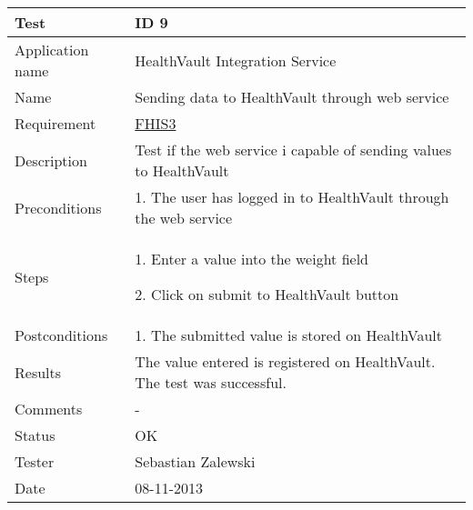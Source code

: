 \begin{table}
\begin{center}
\begin{tabular}{ | l | p{10cm} | }
	\hline
	\textbf{Test}	&	\textbf{ID 9} \\
	\hline\noalign{\smallskip}\noalign{\smallskip}\hline
	Application name	& HealthVault Integration Service \\
	Name				& Sending data to HealthVault through web service \\
	Requirement			& \hyperref[table:reqwebservice]{FHIS3} \\
	Description			& Test if the web service i capable of sending values to HealthVault \\
	Preconditions		&	\par 1. The user has logged in to HealthVault through the web service \\
	Steps 				&	\par 1. Enter a value into the weight field
							\par 2. Click on submit to HealthVault button \\
	Postconditions		&	\par 1. The submitted value is stored on HealthVault \\
	Results				& The value entered is registered on HealthVault.
						  The test was successful. \\
	Comments			& - \\
	Status				& OK \\
	Tester				& Sebastian Zalewski \\
	Date				& 08-11-2013 \\
	\hline
\end{tabular}
\end{center}
\end{table}

